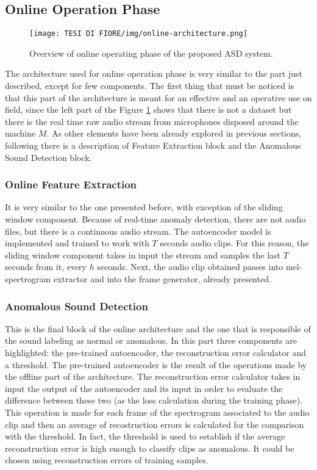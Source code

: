 \subsection{Online Operation Phase}
\begin{figure}[ht]
\texttt{[image: TESI DI FIORE/img/online-architecture.png]}
\centering
\caption{Overview of online operating phase of the proposed ASD system.}
\label{online-asd-system}
\end{figure}
The architecture used for online operation phase is very similar to the part just described, except for few components. The first thing that must be noticed is that this part of the architecture is meant for an effective and an operative use on field, since the left part of the Figure \ref{online-asd-system} shows that there is not a dataset but there is the real time raw audio stream from microphones disposed around the machine $M$. As other elements have been already explored in previous sections, following  there is a description of Feature Extraction block and the Anomalous Sound Detection block. 
\subsubsection{Online Feature Extraction}
It is very similar to the one presented before, with exception of the sliding window component. Because of real-time anomaly detection, there are not audio files, but there is a continuous audio stream. The autoencoder model is implemented and trained to work with $T$ seconds audio clips. For this reason, the sliding window component takes in input the stream and samples the last $T$ seconds from it, every $h$ seconds. Next, the audio clip obtained passes into mel-spectrogram extractor and into the frame generator, already presented. 
\subsubsection{Anomalous Sound Detection}
This is the final block of the online architecture and the one that is responsible of the sound labeling as normal or anomalous. In this part three components are highlighted: the pre-trained autoencoder, the reconstruction error calculator and a threshold. The pre-trained autoencoder is the result of the operations made by the offline part of the architecture. The reconstruction error calculator takes in input the output of the autoencoder and its input in order to evaluate the difference between these two (as the loss calculation during the training phase). This operation is made for each frame of the spectrogram associated to the audio clip and then an average of recostruction errors is calculated for the comparison with the threshold. In fact, the threshold is used to establish if the average reconstruction error is high enough to classify clips as anomalous. It could be chosen using reconstruction errors of training samples.
